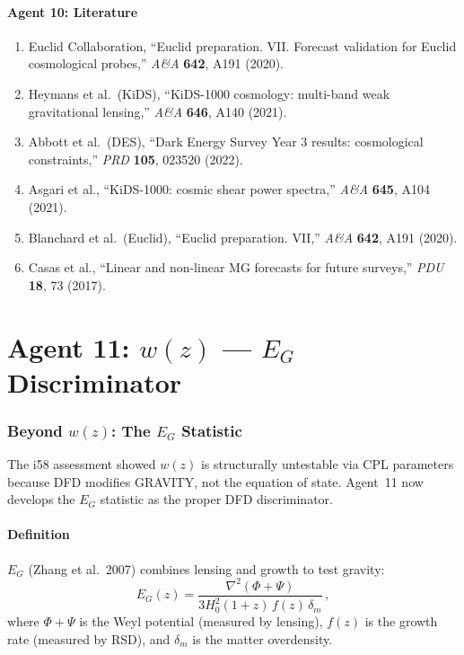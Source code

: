 \documentclass[11pt,a4paper]{article}
\begin{document}
\subsection{Agent 10: Literature}

\begin{enumerate}
\item Euclid Collaboration, ``Euclid preparation. VII. Forecast validation for Euclid cosmological probes,'' \textit{A\&A} \textbf{642}, A191 (2020).
\item Heymans et al.\ (KiDS), ``KiDS-1000 cosmology: multi-band weak gravitational lensing,'' \textit{A\&A} \textbf{646}, A140 (2021).
\item Abbott et al.\ (DES), ``Dark Energy Survey Year 3 results: cosmological constraints,'' \textit{PRD} \textbf{105}, 023520 (2022).
\item Asgari et al., ``KiDS-1000: cosmic shear power spectra,'' \textit{A\&A} \textbf{645}, A104 (2021).
\item Blanchard et al.\ (Euclid), ``Euclid preparation. VII,'' \textit{A\&A} \textbf{642}, A191 (2020).
\item Casas et al., ``Linear and non-linear MG forecasts for future surveys,'' \textit{PDU} \textbf{18}, 73 (2017).
\end{enumerate}


\part{Agent 11: $w(z)$ --- $E_G$ Discriminator}
\label{part:EG}

\section{Beyond $w(z)$: The $E_G$ Statistic}

The i58 assessment showed $w(z)$ is structurally untestable via CPL parameters because DFD modifies GRAVITY, not the equation of state. Agent~11 now develops the $E_G$ statistic as the proper DFD discriminator.

\subsection{Definition}

$E_G$ (Zhang et al.\ 2007) combines lensing and growth to test gravity:
\begin{equation}
E_G(z) = \frac{\nabla^2(\Phi + \Psi)}{3H_0^2(1+z)\,f(z)\,\delta_m}\,,
\end{equation}
where $\Phi + \Psi$ is the Weyl potential (measured by lensing), $f(z)$ is the growth rate (measured by RSD), and $\delta_m$ is the matter overdensity.
\end{document}
